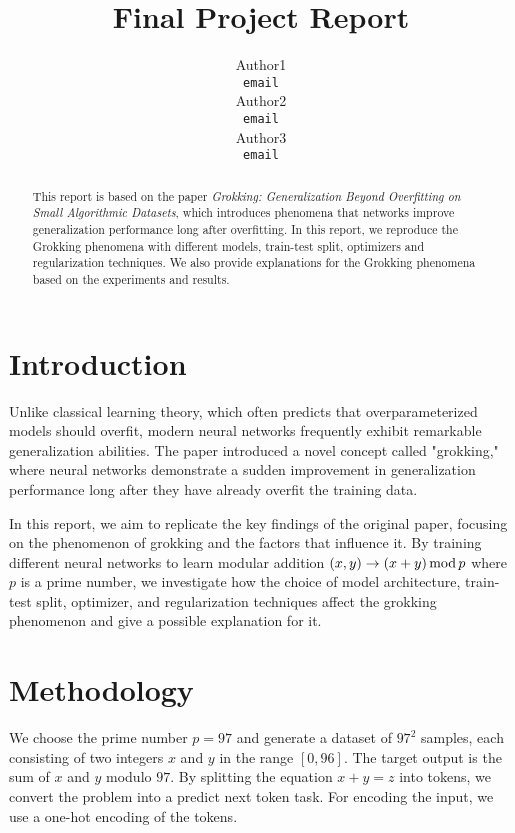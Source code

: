 \documentclass{article}
\title{Final Project Report}
\author{
    Author1 \\
    \texttt{email} \\
    \And
    Author2 \\
    \texttt{email} \\
    \And
    Author3 \\
    \texttt{email} \\
}
\begin{document}
    \maketitle

    \begin{abstract}
        This report is based on the paper \textit{Grokking: Generalization Beyond Overfitting on Small Algorithmic Datasets}, which introduces phenomena that networks improve generalization performance long after overfitting. In this report, we reproduce the Grokking phenomena with different models, train-test split, optimizers and regularization techniques. We also provide explanations for the Grokking phenomena based on the experiments and results.
    \end{abstract}


    \section{Introduction}

    Unlike classical learning theory, which often predicts that overparameterized models should overfit, modern neural networks frequently exhibit remarkable generalization abilities. The paper introduced a novel concept called "grokking," where neural networks demonstrate a sudden improvement in generalization performance long after they have already overfit the training data.

    In this report, we aim to replicate the key findings of the original paper, focusing on the phenomenon of grokking and the factors that influence it. By training different neural networks to learn modular addition $(x, y) \rightarrow (x + y)\, {\rm mod}\, p$ where $p$ is a prime number, we investigate how the choice of model architecture, train-test split, optimizer, and regularization techniques affect the grokking phenomenon and give a possible explanation for it.


    \section{Methodology}

    We choose the prime number $p=97$ and generate a dataset of $97^2$ samples, each consisting of two integers $x$ and $y$ in the range $[0, 96]$. The target output is the sum of $x$ and $y$ modulo $97$. By splitting the equation $x + y = z$ into tokens, we convert the problem into a predict next token task. For encoding the input, we use a one-hot encoding of the tokens.
\end{document}
